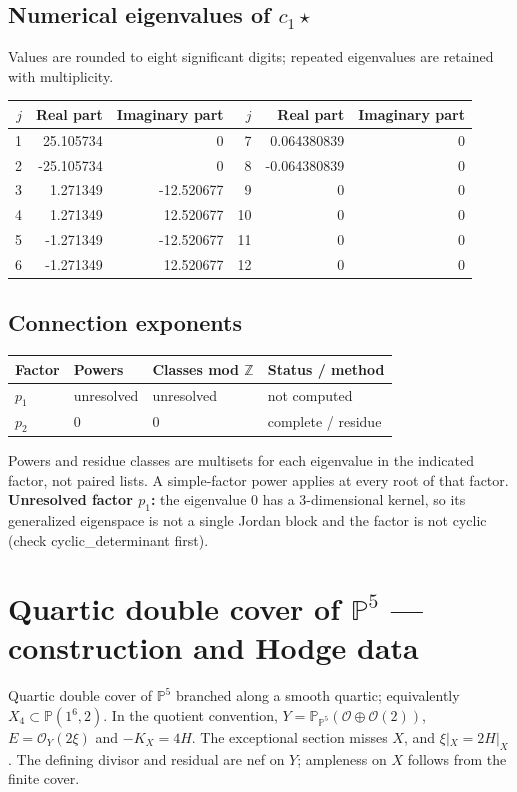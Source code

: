 \documentclass[10pt,a4paper]{article}
\begin{document}
\subsection*{Numerical eigenvalues of $c_1\star$}
Values are rounded to eight significant digits; repeated eigenvalues are retained with multiplicity.
\begin{center}\small\begin{tabular}{rrr@{\qquad}rrr}\toprule $j$ & Real part & Imaginary part & $j$ & Real part & Imaginary part\\\midrule
1 & 25.105734 & 0 & 7 & 0.064380839 & 0\\
2 & -25.105734 & 0 & 8 & -0.064380839 & 0\\
3 & 1.271349 & -12.520677 & 9 & 0 & 0\\
4 & 1.271349 & 12.520677 & 10 & 0 & 0\\
5 & -1.271349 & -12.520677 & 11 & 0 & 0\\
6 & -1.271349 & 12.520677 & 12 & 0 & 0\\
\bottomrule\end{tabular}\end{center}
\subsection*{Connection exponents}
\begin{center}\begin{tabular}{llll}\toprule Factor & Powers & Classes mod $\mathbb Z$ & Status / method\\\midrule
$p_{1}$ & unresolved & unresolved & not computed\\
$p_{2}$ & $0$ & $0$ & complete / residue\\
\bottomrule\end{tabular}\end{center}
Powers and residue classes are multisets for each eigenvalue in the indicated factor, not paired lists. A simple-factor power applies at every root of that factor.
\textbf{Unresolved factor $p_{1}$:} the eigenvalue 0 has a 3-dimensional kernel, so its generalized eigenspace is not a single Jordan block and the factor is not cyclic (check cyclic\_determinant first).
\clearpage\section*{Quartic double cover of $\mathbb P^{5}$ --- construction and Hodge data}\label{entry:QD5-001}
Quartic double cover of $\mathbb P^5$ branched along a smooth quartic; equivalently $X_4\subset\mathbb P(1^6,2)$.
In the quotient convention, $Y=\mathbb P_{\mathbb P^5}(\mathcal O\oplus\mathcal O(2))$, $E=\mathcal O_Y(2\xi)$ and $-K_X=4H$. The exceptional section misses $X$, and $\xi|_X=2H|_X$. The defining divisor and residual are nef on $Y$; ampleness on $X$ follows from the finite cover.
\end{document}
